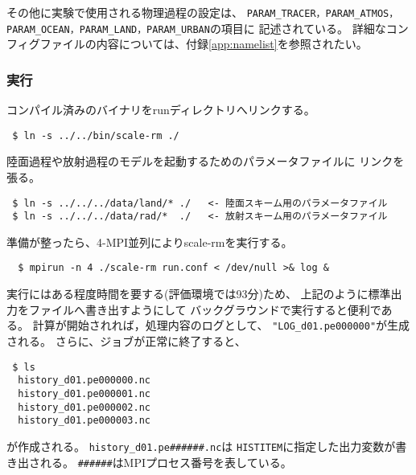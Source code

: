 \noindent その他に実験で使用される物理過程の設定は、
\verb|PARAM_TRACER，PARAM_ATMOS，PARAM_OCEAN，PARAM_LAND，PARAM_URBAN|の項目に
記述されている。
詳細なコンフィグファイルの内容については、付録\ref{app:namelist}を参照されたい。

%
\subsubsection{実行}
コンパイル済みのバイナリをrunディレクトリへリンクする。

\begin{verbatim}
 $ ln -s ../../bin/scale-rm ./
\end{verbatim}
陸面過程や放射過程のモデルを起動するためのパラメータファイルに
リンクを張る。
\begin{verbatim}
 $ ln -s ../../../data/land/* ./   <- 陸面スキーム用のパラメータファイル
 $ ln -s ../../../data/rad/*  ./   <- 放射スキーム用のパラメータファイル
\end{verbatim}
準備が整ったら、4-MPI並列によりscale-rmを実行する。
\begin{verbatim}
  $ mpirun -n 4 ./scale-rm run.conf < /dev/null >& log &
\end{verbatim}

実行にはある程度時間を要する(評価環境では93分)ため、
上記のように標準出力をファイルへ書き出すようにして
バックグラウンドで実行すると便利である。
計算が開始されれば，処理内容のログとして、
\verb|"LOG_d01.pe000000"|が生成される。
さらに、ジョブが正常に終了すると、
\begin{verbatim}
 $ ls
  history_d01.pe000000.nc
  history_d01.pe000001.nc
  history_d01.pe000002.nc
  history_d01.pe000003.nc
\end{verbatim}
が作成される。
\verb|history_d01.pe######.nc|は
\verb|HISTITEM|に指定した出力変数が書き出される。
\verb|######|はMPIプロセス番号を表している。



